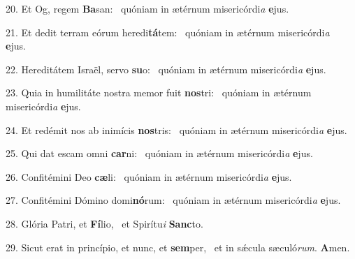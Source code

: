 20. Et Og, regem \textbf{Ba}san: \ast\  quóniam in ætérnum misericórdi\textit{a} \textbf{e}jus.\

21. Et dedit terram eórum heredi\textbf{tá}tem: \ast\  quóniam in ætérnum misericórdi\textit{a} \textbf{e}jus.\

22. Hereditátem Israël, servo \textbf{su}o: \ast\  quóniam in ætérnum misericórdi\textit{a} \textbf{e}jus.\

23. Quia in humilitáte nostra memor fuit \textbf{nos}tri: \ast\  quóniam in ætérnum misericórdi\textit{a} \textbf{e}jus.\

24. Et redémit nos ab inimícis \textbf{nos}tris: \ast\  quóniam in ætérnum misericórdi\textit{a} \textbf{e}jus.\

25. Qui dat escam omni \textbf{car}ni: \ast\  quóniam in ætérnum misericórdi\textit{a} \textbf{e}jus.\

26. Confitémini Deo \textbf{cæ}li: \ast\  quóniam in ætérnum misericórdi\textit{a} \textbf{e}jus.\

27. Confitémini Dómino domi\textbf{nó}rum: \ast\  quóniam in ætérnum misericórdi\textit{a} \textbf{e}jus.\

28. Glória Patri, et \textbf{Fí}lio, \ast\  et Spirítu\textit{i} \textbf{Sanc}to.\

29. Sicut erat in princípio, et nunc, et \textbf{sem}per, \ast\  et in sǽcula sæculó\textit{rum}. \textbf{A}men.\

